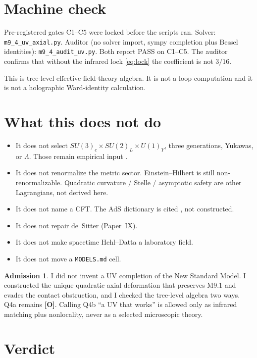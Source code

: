 \documentclass[11pt]{article}
\theoremstyle{definition}
\newtheorem*{admission}{Admission}
\newcommand{\pO}{\textbf{[O]}}
\begin{document}
\section{Machine check}

Pre-registered gates C1--C5 were locked before the scripts ran.
Solver: \texttt{m9\_4\_uv\_axial.py}. Auditor (no solver import,
sympy completion plus Bessel identities):
\texttt{m9\_4\_audit\_uv.py}. Both report PASS on C1--C5.
The auditor confirms that without the infrared lock
\eqref{eq:lock} the coefficient is not $3/16$.

This is tree-level effective-field-theory algebra. It is not a
loop computation and it is not a holographic Ward-identity
calculation.

\section{What this does not do}

\begin{itemize}[leftmargin=1.4em]
\item It does not select $SU(3)_c\times SU(2)_L\times U(1)_Y$,
three generations, Yukawas, or $\Lambda$. Those remain
empirical input \cite{McGwierIII}.
\item It does not renormalize the metric sector. Einstein--Hilbert
is still non-renormalizable. Quadratic curvature / Stelle /
asymptotic safety are other Lagrangians, not derived here.
\item It does not name a CFT. The AdS dictionary is cited
\cite{Witten1998}, not constructed.
\item It does not repair de~Sitter (Paper~IX).
\item It does not make spacetime Hehl--Datta a laboratory field.
\item It does not move a \texttt{MODELS.md} cell.
\end{itemize}

\begin{admission}
I did not invent a UV completion of the New Standard Model. I
constructed the unique quadratic axial deformation that
preserves M9.1 and evades the contact obstruction, and I checked
the tree-level algebra two ways. Q4a remains \pO{}. Calling Q4b
``a UV that works'' is allowed only as infrared matching plus
nonlocality, never as a selected microscopic theory.
\end{admission}

\section{Verdict}
\end{document}
